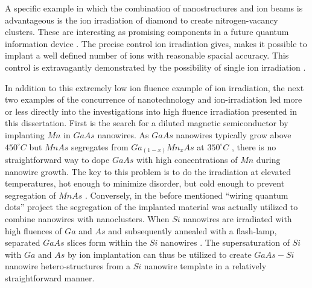 A specific example in which the combination of nanostructures and ion beams is advantageous is the ion irradiation of diamond to create nitrogen-vacancy clusters. These are interesting as promising components in a future quantum information device \cite{babinec_diamond_2010}. The precise control ion irradiation gives, makes it possible to implant a well defined number of ions with reasonable spacial accuracy. This control is extravagantly demonstrated by the possibility of single ion irradiation \cite{meijer_concept_2006,ohdomari_single-ion_2008}. 

In addition to this extremely low ion fluence example of ion irradiation, the next two examples of the concurrence of nanotechnology and ion-irradiation led more or less directly into the investigations into high fluence irradiation presented in this dissertation. First is the search for a diluted magnetic semiconductor by implanting $Mn$ in $GaAs$ nanowires. As $GaAs$ nanowires typically grow above $450^\circ C$ but $MnAs$ segregates from $Ga_{(1-x)}Mn_xAs$ at $350^\circ C$ \cite{dietl_engineering_2006,sadowski_gaasmnas_2011}, there is no straightforward way to dope $GaAs$ with high concentrations of $Mn$ during nanowire growth. The key to this problem is to do the irradiation at elevated temperatures, hot enough to minimize disorder, but cold enough to prevent segregation of $MnAs$ \cite{borschel_new_2011,paschoal_hopping_2012,borschel_ion-solid_2012,kumar_magnetic_2013,paschoal_magnetoresistance_2014}. Conversely, in the before mentioned ``wiring quantum dots'' project the segregation of the implanted material was actually utilized to combine nanowires with nanoclusters. When $Si$ nanowires are irradiated with high fluences of $Ga$ and $As$ and subsequently annealed with a flash-lamp, separated $GaAs$ slices form within the $Si$ nanowires \cite{prucnal_iii-v_2014,glaser_personal_2015}. The supersaturation of $Si$ with $Ga$ and $As$ by ion implantation can thus be utilized to create $GaAs - Si$ nanowire hetero-structures from a $Si$ nanowire template in a relatively straightforward manner.
 
